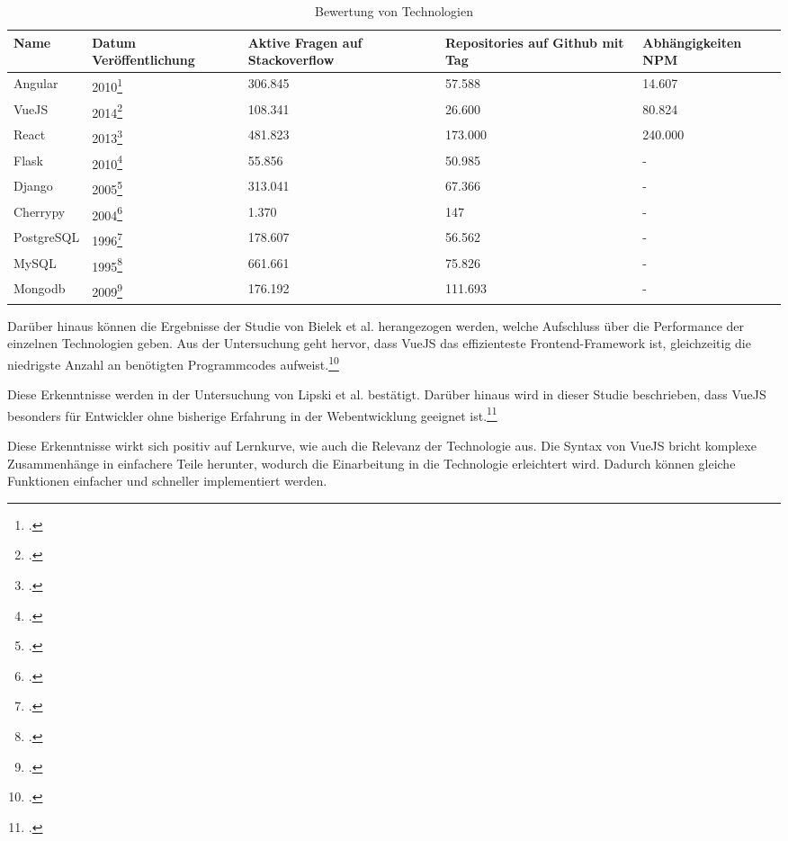 \begin{table}[h!]
    \centering
    \begin{tabular}{|l|p{2cm}|p{3cm}|p{3cm}|p{3cm}|}
        \hline
        \rowcolor{lightgray} Name & \textbf{Datum Veröffentlichung} & \textbf{Aktive Fragen auf Stackoverflow} & \textbf{Repositories auf Github mit Tag} & \textbf{Abhängigkeiten NPM} \\ \hline
        Angular & 2010\footcite{githubAngularReleaseV090} & 306.845 & 57.588 & 14.607 \\ \hline
        VueJS & 2014\footcite{eggheadEvanYou} & 108.341 & 26.600 & 80.824 \\ \hline
        React & 2013\footcite{githubReactCHANGELOG} & 481.823 & 173.000 & 240.000 \\ \hline
        \hline
        Flask & 2010\footcite{pypiFlask} & 55.856 & 50.985 & - \\ \hline
        Django & 2005\footcite{pypiDjango} & 313.041 & 67.366 & - \\ \hline
        Cherrypy & 2004\footcite{pypiCherryPy} & 1.370 & 147 & - \\ \hline
        \hline
        PostgreSQL & 1996\footcite{postgresqlHappyBirthday} & 178.607 & 56.562 & - \\ \hline
        MySQL & 1995\footcite{amazonWhatMySQL} & 661.661 & 75.826 & - \\ \hline
        Mongodb & 2009\footcite{mongodbMongoDBEvolved} & 176.192 & 111.693 & - \\ \hline
    \end{tabular}
    \caption{Bewertung von Technologien}\label{tab:Analyseergebnise Relevanz der Plattformen}
\end{table}

Darüber hinaus können die Ergebnisse der Studie von Bielek et al. herangezogen werden, welche Aufschluss über die Performance der einzelnen Technologien geben.
Aus der Untersuchung geht hervor, dass VueJS das effizienteste Frontend-Framework ist, gleichzeitig die niedrigste Anzahl an benötigten Programmcodes aufweist.\footcite{Bielak_2022}

Diese Erkenntnisse werden in der Untersuchung von Lipski et al. bestätigt.
Darüber hinaus wird in dieser Studie beschrieben, dass VueJS besonders für Entwickler ohne bisherige Erfahrung in der Webentwicklung geeignet ist.\footcite{Lipski_2021}

Diese Erkenntnisse wirkt sich positiv auf Lernkurve, wie auch die Relevanz der Technologie aus.
Die Syntax von VueJS bricht komplexe Zusammenhänge in einfachere Teile herunter, wodurch die Einarbeitung in die Technologie erleichtert wird.
Dadurch können gleiche Funktionen einfacher und schneller implementiert werden.

